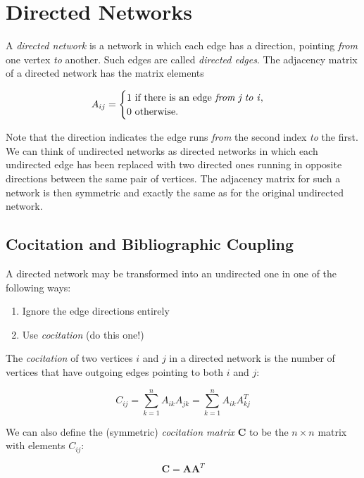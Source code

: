 \documentclass[12pt]{book}
\begin{document}
\section{Directed Networks}
A \textit{directed network} is a network in which each edge has a direction, pointing \textit{from} one vertex \textit{to} another.  Such edges are called \textit{directed edges}.  The adjacency matrix of a directed network has the matrix elements

\begin{equation}
A_{ij} = 
  \begin{cases}
    1$ if there is an edge \textit{from j to i}$, \\
    0$ otherwise$.
  \end{cases}
\end{equation}

Note that the direction indicates the edge runs \textit{from} the second index \textit{to} the first. \\

We can think of undirected networks as directed networks in which each undirected edge has been replaced with two directed ones running in opposite directions between the same pair of vertices.  The adjacency matrix for such a network is then symmetric and exactly the same as for the original undirected network.

\subsection{Cocitation and Bibliographic Coupling}
A directed network may be transformed into an undirected one in one of the following ways:
\begin{enumerate}
  \item Ignore the edge directions entirely
  \item Use \textit{cocitation} (do this one!)
\end{enumerate}
The \textit{cocitation} of two vertices $i$ and $j$ in a directed network is the number of vertices that have outgoing edges pointing to both $i$ and $j$:

\begin{equation}
C_{ij} = \sum\limits_{k=1}^n A_{ik}A_{jk} = \sum\limits_{k=1}^n A_{ik}A_{kj}^T
\end{equation}

We can also define the (symmetric) \textit{cocitation matrix} \textbf{C} to be the $n \times n$ matrix with elements $C_{ij}$:

\begin{equation}
\mathbf{C}=\mathbf{AA}^T
\end{equation}
\end{document}
